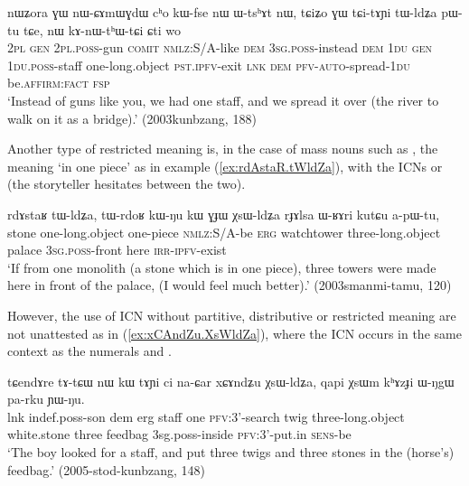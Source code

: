 \begin{exe}
\ex \label{ex:tAYi.tWldZa}
\gll nɯʑora ɣɯ nɯ-ɕɤmɯɣdɯ cʰo kɯ-fse nɯ ɯ-tsʰɤt nɯ, tɕiʑo ɣɯ tɕi-tɤɲi tɯ-ldʑa pɯ-tu tɕe, nɯ kɤ-nɯ-tʰɯ-tɕi ɕti wo \\
\textsc{2pl} \textsc{gen} \textsc{2pl}.\textsc{poss}-gun \textsc{comit} \textsc{nmlz}:S/A-like \textsc{dem} \textsc{3sg}.\textsc{poss}-instead \textsc{dem}  \textsc{1du} \textsc{gen} \textsc{1du}.\textsc{poss}-staff one-long.object \textsc{pst}.\textsc{ipfv}-exit \textsc{lnk} \textsc{dem} \textsc{pfv}-\textsc{auto}-spread-\textsc{1du} be.\textsc{affirm}:\textsc{fact} \textsc{fsp} \\
\glt `Instead of guns like you, we had one staff, and we spread it over (the river to walk on it as a bridge).' (2003kunbzang, 188)
\end{exe} 

Another type of restricted meaning is, in the case of mass nouns such as , the meaning `in one piece' as in example (\ref{ex:rdAstaR.tWldZa}), with the ICNs  or  (the storyteller hesitates between the two).

\begin{exe}
\ex \label{ex:rdAstaR.tWldZa}
\gll rdɤstaʁ tɯ-ldʑa, tɯ-rdoʁ kɯ-ŋu kɯ ɣɟɯ χsɯ-ldʑa rɟɤlsa ɯ-ʁɤri kutɕu a-pɯ-tu, \\
stone one-long.object one-piece \textsc{nmlz}:S/A-be \textsc{erg} watchtower three-long.object palace \textsc{3sg}.\textsc{poss}-front here \textsc{irr}-\textsc{ipfv}-exist \\
\glt `If from one monolith (a stone which is in one piece), three  towers were made here in front of the palace, (I would feel much better).'  (2003smanmi-tamu, 120)
\end{exe} 

However, the use of ICN without partitive, distributive or restricted meaning are not unattested as in  (\ref{ex:xCAndZu.XsWldZa}), where the ICN  occurs in the same context as the numerals  and .

\begin{exe}
\ex \label{ex:xCAndZu.XsWldZa}
\gll tɕendɤre tɤ-tɕɯ nɯ kɯ tɤɲi ci na-ɕar xɕɤndʑu χsɯ-ldʑa, qapi χsɯm kʰɤzɟi ɯ-ŋgɯ pa-rku ɲɯ-ŋu. \\
lnk indef.poss-son dem erg staff one \textsc{pfv}:3'-search twig three-long.object white.stone three feedbag 3sg.poss-inside \textsc{pfv}:3'-put.in \textsc{sens}-be \\
\glt `The boy looked for a staff, and put three twigs and three stones in the (horse's) feedbag.' (2005-stod-kunbzang, 148)
\end{exe} 

